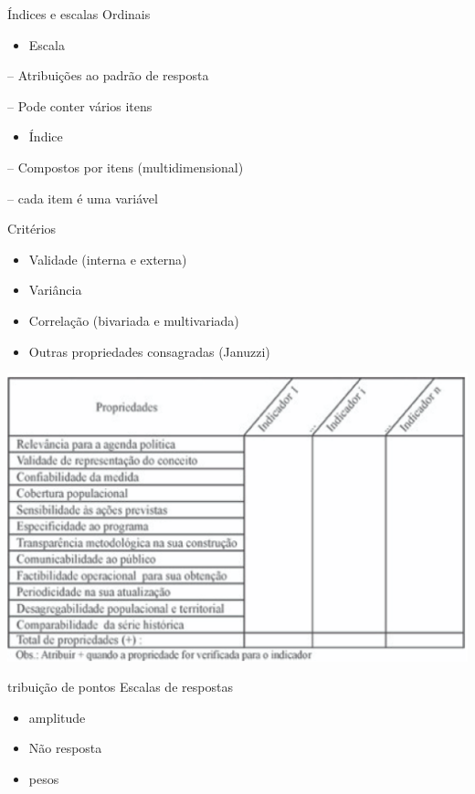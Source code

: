 \documentclass[
  9pt,
  ignorenonframetext,
  aspectratio=169]{beamer}
\providecommand{\tightlist}{%
  \setlength{\itemsep}{0pt}\setlength{\parskip}{0pt}}
\begin{document}
\begin{frame}{Índices e escalas}
\protect\hypertarget{uxedndices-e-escalas}{}
Ordinais

\begin{itemize}
\tightlist
\item
  Escala
\end{itemize}

-- Atribuições ao padrão de resposta

-- Pode conter vários itens

\begin{itemize}
\tightlist
\item
  Índice
\end{itemize}

-- Compostos por itens (multidimensional)

-- cada item é uma variável
\end{frame}

\begin{frame}{Critérios}
\protect\hypertarget{crituxe9rios}{}
\begin{itemize}
\item
  Validade (interna e externa)
\item
  Variância
\item
  Correlação (bivariada e multivariada)
\item
  Outras propriedades consagradas (Januzzi)
\end{itemize}
\end{frame}

\begin{frame}{}
\protect\hypertarget{section}{}
\includegraphics{imgs/indicadores}
\end{frame}

\begin{frame}{tribuição de pontos}
\protect\hypertarget{tribuiuxe7uxe3o-de-pontos}{}
Escalas de respostas

\begin{itemize}
\item
  amplitude
\item
  Não resposta
\item
  pesos
\end{itemize}
\end{frame}
\end{document}
